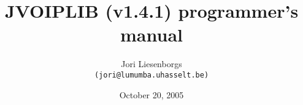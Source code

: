 \documentclass[12pt,a4paper]{report}
\begin{document}
	\author{Jori Liesenborgs\\{\tt (jori@lumumba.uhasselt.be)}}
	\date{October 20, 2005}
	\title{JVOIPLIB (v1.4.1) programmer's manual}
	\maketitle

	\newpage
	\setcounter{page}{1}
	

	\newpage
	\tableofcontents

	\newpage
	\listoffigures

	\newpage
	\setcounter{page}{1}
	
	
	
	
	
\end{document}

